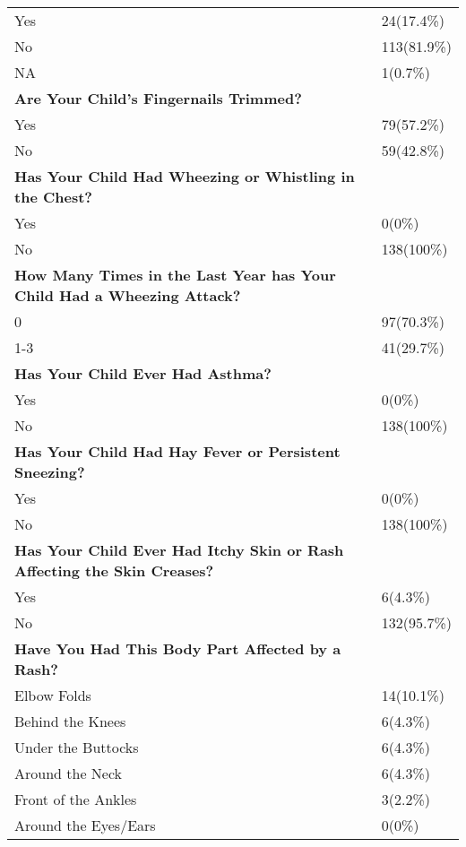 \documentclass[6pt,letterpaper]{article}
\begin{document}
\begin{tabular}{|l  l|}
Yes & 24(17.4\%) \\
No & 113(81.9\%) \\
NA & 1(0.7\%) \\
\hline
\textbf{Are Your Child's Fingernails Trimmed?} \\
\hline
Yes & 79(57.2\%) \\
No & 59(42.8\%) \\
\hline
\textbf{Has Your Child Had Wheezing or Whistling in the Chest?} \\
\hline
Yes & 0(0\%) \\
No & 138(100\%) \\
\hline
\textbf{How Many Times in the Last Year has Your Child Had a Wheezing Attack?} \\
\hline
0 & 97(70.3\%) \\
1-3 & 41(29.7\%) \\
\hline
\textbf{Has Your Child Ever Had Asthma?} \\
\hline
Yes & 0(0\%) \\
No & 138(100\%) \\
\hline
\textbf{Has Your Child Had Hay Fever or Persistent Sneezing?} \\
\hline
Yes & 0(0\%) \\
No & 138(100\%) \\
\hline
\textbf{Has Your Child Ever Had Itchy Skin or Rash Affecting the Skin Creases?} \\
\hline
Yes & 6(4.3\%) \\
No & 132(95.7\%) \\
\hline
\textbf{Have You Had This Body Part Affected by a Rash?} \\
\hline
Elbow Folds & 14(10.1\%) \\
Behind the Knees & 6(4.3\%) \\
Under the Buttocks & 6(4.3\%) \\
Around the Neck & 6(4.3\%) \\
Front of the Ankles & 3(2.2\%) \\
Around the Eyes/Ears & 0(0\%) \\
\hline 
\end{tabular}
\end{document}
